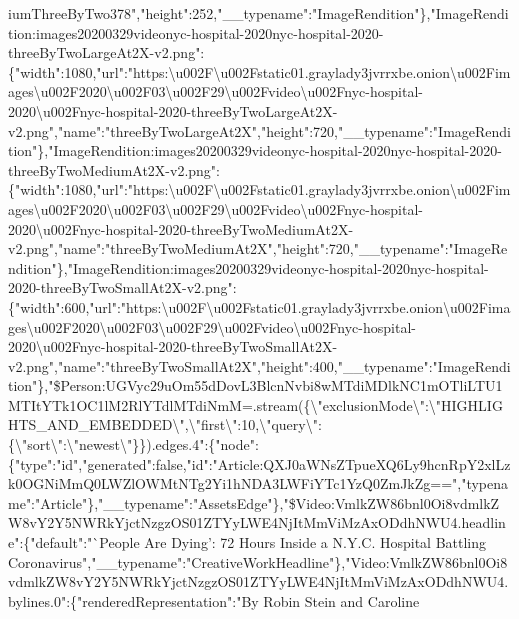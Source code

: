 iumThreeByTwo378","height":252,"\_\_typename":"ImageRendition"\},"ImageRendition:images20200329videonyc-hospital-2020nyc-hospital-2020-threeByTwoLargeAt2X-v2.png":\{"width":1080,"url":"https:\textbackslash{}u002F\textbackslash{}u002Fstatic01.graylady3jvrrxbe.onion\textbackslash{}u002Fimages\textbackslash{}u002F2020\textbackslash{}u002F03\textbackslash{}u002F29\textbackslash{}u002Fvideo\textbackslash{}u002Fnyc-hospital-2020\textbackslash{}u002Fnyc-hospital-2020-threeByTwoLargeAt2X-v2.png","name":"threeByTwoLargeAt2X","height":720,"\_\_typename":"ImageRendition"\},"ImageRendition:images20200329videonyc-hospital-2020nyc-hospital-2020-threeByTwoMediumAt2X-v2.png":\{"width":1080,"url":"https:\textbackslash{}u002F\textbackslash{}u002Fstatic01.graylady3jvrrxbe.onion\textbackslash{}u002Fimages\textbackslash{}u002F2020\textbackslash{}u002F03\textbackslash{}u002F29\textbackslash{}u002Fvideo\textbackslash{}u002Fnyc-hospital-2020\textbackslash{}u002Fnyc-hospital-2020-threeByTwoMediumAt2X-v2.png","name":"threeByTwoMediumAt2X","height":720,"\_\_typename":"ImageRendition"\},"ImageRendition:images20200329videonyc-hospital-2020nyc-hospital-2020-threeByTwoSmallAt2X-v2.png":\{"width":600,"url":"https:\textbackslash{}u002F\textbackslash{}u002Fstatic01.graylady3jvrrxbe.onion\textbackslash{}u002Fimages\textbackslash{}u002F2020\textbackslash{}u002F03\textbackslash{}u002F29\textbackslash{}u002Fvideo\textbackslash{}u002Fnyc-hospital-2020\textbackslash{}u002Fnyc-hospital-2020-threeByTwoSmallAt2X-v2.png","name":"threeByTwoSmallAt2X","height":400,"\_\_typename":"ImageRendition"\},"\$Person:UGVyc29uOm55dDovL3BlcnNvbi8wMTdiMDlkNC1mOTliLTU1MTItYTk1OC1lM2RlYTdlMTdiNmM=.stream(\{\textbackslash{}"exclusionMode\textbackslash{}":\textbackslash{}"HIGHLIGHTS\_AND\_EMBEDDED\textbackslash{}",\textbackslash{}"first\textbackslash{}":10,\textbackslash{}"query\textbackslash{}":\{\textbackslash{}"sort\textbackslash{}":\textbackslash{}"newest\textbackslash{}"\}\}).edges.4":\{"node":\{"type":"id","generated":false,"id":"Article:QXJ0aWNsZTpueXQ6Ly9hcnRpY2xlLzk0OGNiMmQ0LWZlOWMtNTg2Yi1hNDA3LWFiYTc1YzQ0ZmJkZg==","typename":"Article"\},"\_\_typename":"AssetsEdge"\},"\$Video:VmlkZW86bnl0Oi8vdmlkZW8vY2Y5NWRkYjctNzgzOS01ZTYyLWE4NjItMmViMzAxODdhNWU4.headline":\{"default":"`People
Are Dying': 72 Hours Inside a N.Y.C. Hospital Battling
Coronavirus","\_\_typename":"CreativeWorkHeadline"\},"Video:VmlkZW86bnl0Oi8vdmlkZW8vY2Y5NWRkYjctNzgzOS01ZTYyLWE4NjItMmViMzAxODdhNWU4.bylines.0":\{"renderedRepresentation":"By
Robin Stein and Caroline
